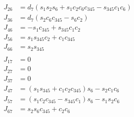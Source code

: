\documentclass{article}
\begin{document}
\begin{align*}
J_{26} &= d_{7} \left(s_{1} s_{2} s_{6} + s_{1} c_{2} c_{6} c_{345} - s_{345} c_{1} c_{6}\right) \\
J_{36} &= d_{7} \left(s_{2} c_{6} c_{345} - s_{6} c_{2}\right) \\
J_{46} &= - s_{1} c_{345} + s_{345} c_{1} c_{2} \\
J_{56} &= s_{1} s_{345} c_{2} + c_{1} c_{345} \\
J_{66} &= s_{2} s_{345} \\
\\
J_{17} &= 0 \\
J_{27} &= 0 \\
J_{37} &= 0 \\
J_{47} &= \left(s_{1} s_{345} + c_{1} c_{2} c_{345}\right) s_{6} - s_{2} c_{1} c_{6} \\
J_{57} &= \left(s_{1} c_{2} c_{345} - s_{345} c_{1}\right) s_{6} - s_{1} s_{2} c_{6} \\
J_{67} &= s_{2} s_{6} c_{345} + c_{2} c_{6} \\
\end{align*}
\end{document}
